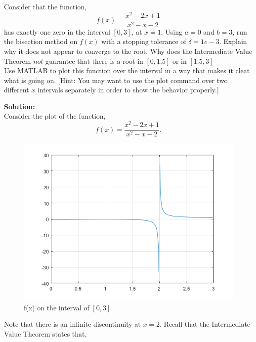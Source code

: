 \documentclass[12pt]{article}
\makeatletter
\theoremstyle{homework}
\newenvironment{exercise}[1]
{\def\@currentlabel{#1}\exercisecore}
{\endexercisecore}
\newcommand{\localhead}[1]{\par\smallskip\noindent\textbf{#1}\nobreak\\}%
\newcommand\solution{\localhead{Solution:}}
\makeatother
\begin{document}
\begin{exercise}{Chapter 4: 10} Consider that the function,
  \begin{equation*}
    f(x) = \dfrac{x^2 - 2x + 1}{x^2 - x - 2}
  \end{equation*}
  has exactly one zero in the interval $[0,3]$, at $x = 1$. Using $a = 0$ and $b = 3$, run the bisection method on $f(x)$ with a 
  stopping tolerance of $\delta = 1e-3$. Explain why it does not appear to converge to the root. Why does the Intermediate Value Theorem
  $not$ guarantee that there is a root in $[0, 1.5]$ or in $[1.5,3]$\\
  
  Use MATLAB to plot this function over the interval in a way that makes it cleat what is going on. [Hint: You may want to use the plot command 
  over two different $x$ intervals separately in order to show the behavior properly.]\\
  
  \solution Consider the plot of the function,
  \begin{equation*}
    f(x) = \dfrac{x^2 - 2x + 1}{x^2 - x - 2}.
  \end{equation*}

  \begin{figure}[H]
    \caption{f(x) on the interval of $[0,3]$}
    \centering
    \includegraphics[width = .75 \textwidth,]{entire.png}
    \end{figure}
  Note that there is an infinite discontinuity at $x = 2$. Recall that the Intermediate Value Theorem states that,


\end{exercise}
\end{document}
